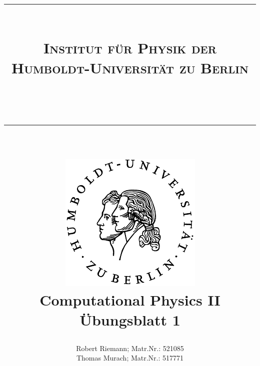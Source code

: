 \documentclass[a4paper,oneside,bibtotoc,smallheadings,pointlessnumbers,
halfparskip,DIV15]{scrartcl}
\newcommand{\lref}[1]{Listing (\ref{lst:#1})} %
\newcommand{\eref}[1]{Gl. (\ref{eqn:#1})} %
\begin{document}
\title{{\centering \rule{15cm}{0.001cm}\\
\Large{\textsc{Institut für Physik der
Humboldt-Universität zu Berlin}}}\\ \centering \rule{15cm}{0.001cm}\\
\vspace{15mm} \centering
\includegraphics[scale=0.9]{../assets/siegel}\\
\vspace{18mm}
{\bf{\huge{Computational Physics II}}}\\
Übungsblatt 1\\
}
\author{Robert Riemann; Matr.Nr.: 521085\\
Thomas Murach; Matr.Nr.: 517771\vspace{18mm}}
\vspace{18mm}
\maketitle

\tableofcontents
\listoffigures
\listoftables


% 
% 
% 
% 

% 
% 
% 
\end{document}
